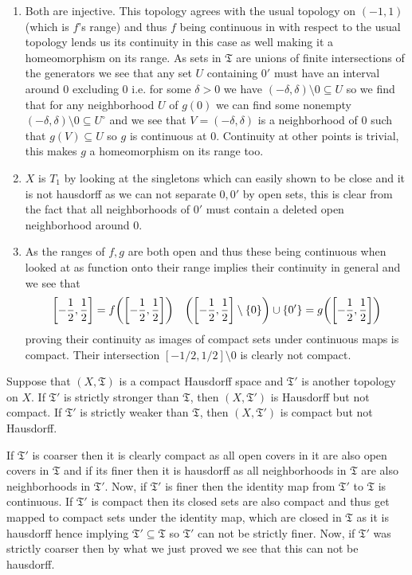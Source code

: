 \documentclass[12pt,a4paper]{article}
\begin{document}
\begin{solution}
\begin{enumerate}[label=\alph*.]
    \item Both are injective. 
    This topology agrees with the usual topology on $(-1,1)$ (which is $f$'s range) and thus $f$ being continuous in with respect to the usual topology lends us its continuity in this case as well making it a homeomorphism on its range. 
    As sets in $\mathfrak T$ are unions of finite intersections of the generators we see that any set $U$ containing $0'$ must have an interval around $0$ excluding $0$ i.e. for some $\delta>0$ we have $(-\delta,\delta)\setminus \qty{0} \subseteq U$ so we find that for any neighborhood $U$ of $g(0)$ we can find some nonempty $(-\delta,\delta)\setminus \qty{0}\subseteq U^\circ$ and we see that $V=(-\delta,\delta)$ is a neighborhood of $0$ such that $g(V) \subseteq U$ so $g$ is continuous at $0.$ 
    Continuity at other points is trivial, this makes $g$ a homeomorphism on its range too.
    \item $X$ is $T_1$ by looking at the singletons which can easily shown to be close and it is not hausdorff as we can not separate $0,0'$ by open sets, this is clear from the fact that all neighborhoods of $0'$ must contain a deleted open neighborhood around $0$. 
    \item As the ranges of $f,g$ are both open and thus these being continuous when looked at as function onto their range implies their continuity in general and we see that 
        \[
            \qty[-\frac{1}{2}, \frac{1}{2}]=f\qty(\qty[ -\frac{1}{2}, \frac{1}{2}])\quad\qty(\qty[-\frac{1}{2}, \frac{1}{2}]\setminus \qty{0})\cup \qty{0'}=g\qty(\qty[ -\frac{1}{2}, \frac{1}{2}])
        \]
        proving their continuity as images of compact sets under continuous maps is compact. 
        Their intersection $[-1/2,1/2]\setminus \qty{0}$ is clearly not compact. 
\end{enumerate}
\end{solution}
\begin{problem}\label{prob:4-38}
Suppose that $(X, \mathfrak{T})$ is a compact Hausdorff space and $\mathfrak{T}'$ is another topology on $X$. If $\mathfrak{T}'$ is strictly stronger than $\mathfrak{T}$, then $(X,\mathfrak{T}')$ is Hausdorff but not compact. If $\mathfrak{T}'$ is strictly weaker than $\mathfrak{T}$, then $(X,\mathfrak{T}')$ is compact but not Hausdorff.
\end{problem}
\begin{solution}
If $\mathfrak T'$ is coarser then it is clearly compact as all open covers in it are also open covers in $\mathfrak T$ and if its finer then it is hausdorff as all neighborhoods in $\mathfrak T$ are also neighborhoods in $\mathfrak T'$. 
Now, if $\mathfrak T'$ is finer then the identity map from $\mathfrak T'$ to $\mathfrak T$ is continuous. 
If $\mathfrak T'$ is compact then its closed sets are also compact and thus get mapped to compact sets under the identity map, which are closed in $\mathfrak T$ as it is hausdorff hence implying $\mathfrak T' \subseteq \mathfrak T$ so $\mathfrak T'$ can not be strictly finer. 
Now, if $\mathfrak T'$ was strictly coarser then by what we just proved we see that this can not be hausdorff.
\end{solution}
\end{document}

